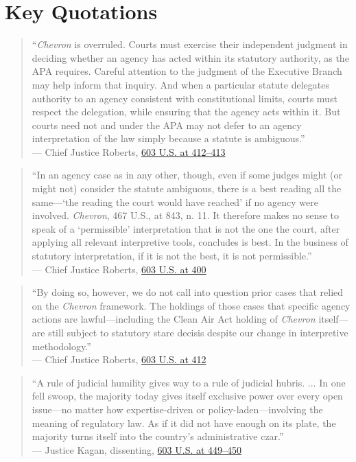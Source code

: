 \documentclass[12pt]{article}
\begin{document}
\section{Key Quotations}

\begin{quote}
``\textit{Chevron} is overruled. Courts must exercise their independent judgment in deciding whether an agency has acted within its statutory authority, as the APA requires. Careful attention to the judgment of the Executive Branch may help inform that inquiry. And when a particular statute delegates authority to an agency consistent with constitutional limits, courts must respect the delegation, while ensuring that the agency acts within it. But courts need not and under the APA may not defer to an agency interpretation of the law simply because a statute is ambiguous.''\\
--- Chief Justice Roberts, \href{https://www.law.cornell.edu/supremecourt/text/22-451}{603 U.S. at 412--413}
\end{quote}

\begin{quote}
``In an agency case as in any other, though, even if some judges might (or might not) consider the statute ambiguous, there is a best reading all the same---`the reading the court would have reached' if no agency were involved. \textit{Chevron}, 467 U.S., at 843, n. 11. It therefore makes no sense to speak of a `permissible' interpretation that is not the one the court, after applying all relevant interpretive tools, concludes is best. In the business of statutory interpretation, if it is not the best, it is not permissible.''\\
--- Chief Justice Roberts, \href{https://www.law.cornell.edu/supremecourt/text/22-451}{603 U.S. at 400}
\end{quote}

\begin{quote}
``By doing so, however, we do not call into question prior cases that relied on the \textit{Chevron} framework. The holdings of those cases that specific agency actions are lawful---including the Clean Air Act holding of \textit{Chevron} itself---are still subject to statutory stare decisis despite our change in interpretive methodology.''\\
--- Chief Justice Roberts, \href{https://www.law.cornell.edu/supremecourt/text/22-451}{603 U.S. at 412}
\end{quote}

\begin{quote}
``A rule of judicial humility gives way to a rule of judicial hubris. ... In one fell swoop, the majority today gives itself exclusive power over every open issue---no matter how expertise-driven or policy-laden---involving the meaning of regulatory law. As if it did not have enough on its plate, the majority turns itself into the country's administrative czar.''\\
--- Justice Kagan, dissenting, \href{https://www.law.cornell.edu/supremecourt/text/22-451}{603 U.S. at 449--450}
\end{quote}
\end{document}
